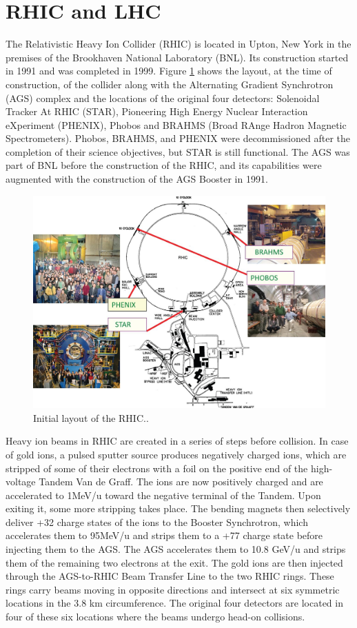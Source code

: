 \section{RHIC and LHC}
The Relativistic Heavy Ion Collider (RHIC) is located in Upton, New York in the premises of the Brookhaven National Laboratory (BNL). Its construction started in 1991 and was completed in 1999. Figure \ref{fig:RHIC_layout} shows the layout, at the time of construction, of the collider along with the Alternating Gradient Synchrotron (AGS) complex and the locations of the original four detectors: Solenoidal Tracker At RHIC (STAR), Pioneering High Energy Nuclear Interaction eXperiment (PHENIX), Phobos and BRAHMS (Broad RAnge Hadron Magnetic Spectrometers). Phobos, BRAHMS, and PHENIX were decommissioned after the completion of their science objectives, but STAR is still functional. The AGS was part of BNL before the construction of the RHIC, and its capabilities were augmented with the construction of the AGS Booster in 1991.
\begin{figure}[h]
  \centering
  \includegraphics[width=6.5in]{figures/RHIC_Layout.jpeg}
  \caption{Initial layout of the RHIC.\cite{doi:10.1093/ptep/ptu093}.}\label{fig:RHIC_layout}
\end{figure}

Heavy ion beams in RHIC are created in a series of steps before collision. In case of gold ions, a pulsed sputter source produces negatively charged ions, which are stripped of some of their electrons with a foil on the positive end of the high-voltage Tandem Van de Graff. The ions are now positively charged and are accelerated to 1MeV/u toward the negative terminal of the Tandem. Upon exiting it, some more stripping takes place. The bending magnets then selectively deliver +32 charge states of the ions to the Booster Synchrotron, which accelerates them to 95MeV/u and strips them to a +77 charge state before injecting them to the AGS. The AGS accelerates them to 10.8 GeV/u and strips them of the remaining two electrons at the exit. The gold ions are then injected through the AGS-to-RHIC Beam Transfer Line to the two RHIC rings. These rings carry beams moving in opposite directions and intersect at six symmetric locations in the 3.8 km circumference. The original four detectors are located in four of these six locations where the beams undergo head-on collisions.

